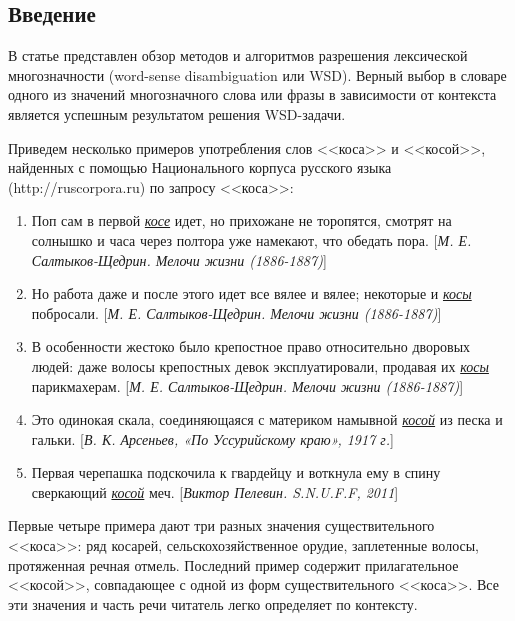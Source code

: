 \documentclass{article}
\begin{document}

\maketitle

\begin{articletext}
\section{Введение}
В статье представлен обзор методов и алгоритмов разрешения лексической многозначности (word-sense disambiguation или WSD). Верный выбор в словаре одного из значений многозначного слова или фразы в зависимости от контекста является успешным результатом решения WSD-задачи.

Приведем несколько примеров употребления слов <<коса>> и <<косой>>, найденных с помощью Национального корпуса русского языка (http://ruscorpora.ru) по запросу <<коса>>:

\begin{enumerate}
\item Поп сам в первой \textit{\underline{косе}} идет, но прихожане не торопятся, смотрят на солнышко и часа через полтора уже намекают, что обедать пора. {\footnotesize[\textit{М. Е. Салтыков-Щедрин. Мелочи жизни (1886-1887)}]}
\item Но работа даже и после этого идет все вялее и вялее; некоторые и \textit{\underline{косы}} побросали. {\footnotesize[\textit{М. Е. Салтыков-Щедрин. Мелочи жизни (1886-1887)}]}
\item В особенности жестоко было крепостное право относительно дворовых людей: даже волосы крепостных девок эксплуатировали, продавая их \textit{\underline{косы}} парикмахерам. {\footnotesize[\textit{М. Е. Салтыков-Щедрин. Мелочи жизни (1886-1887)}]}
\item Это одинокая скала, соединяющаяся с материком намывной \textit{\underline{косой}} из песка и гальки. {\footnotesize[\textit{В. К. Арсеньев, «По Уссурийскому краю», 1917 г.}]}
\item Первая черепашка подскочила к гвардейцу и воткнула ему в спину сверкающий \textit{\underline{косой}} меч. {\footnotesize[\textit{Виктор Пелевин. S.N.U.F.F, 2011}]}
\end{enumerate}

Первые четыре примера дают три разных значения существительного <<коса>>: ряд косарей, сельскохозяйственное орудие, заплетенные волосы, протяженная речная отмель. Последний пример содержит прилагательное <<косой>>, совпадающее с одной из форм существительного <<коса>>. Все эти значения и часть речи читатель легко определяет по контексту. 


\end{articletext}
\end{document}
